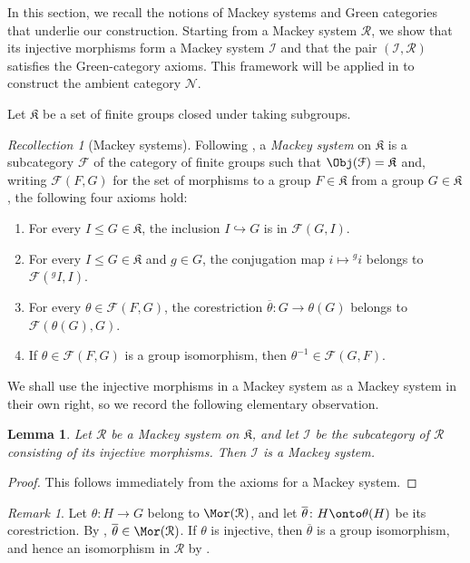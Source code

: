 \documentclass{amsart}
\numberwithin{equation}{section}%
\newtheorem{Lem}[equation]{Lemma}
\theoremstyle{remark}
\newtheorem{Rem}[equation]{Remark}
\newtheorem{Rec}[equation]{Recollection}
\theoremstyle{definition}
\newcommand{\ol}[1]{\overline{#1}}
\begin{document}
In this section, we recall the notions of Mackey systems and Green
categories that underlie our construction. Starting from a Mackey
system $\mathcal R$, we show that its injective morphisms form a
Mackey system $\mathcal I$ and that the pair
$(\mathcal I,\mathcal R)$ satisfies the Green-category axioms.
This framework will be applied in 
to construct the ambient category $\mathcal N$.

Let $\mathfrak K$ be a set of finite groups closed under taking subgroups.
%
\begin{Rec}[Mackey systems]
	\label{rec:mackey-systems}
Following \cite[Sec.~3]{Barker16a}, a \emph{Mackey system} on
$\mathfrak K$ is a subcategory $\mathcal F$ of the category of finite
groups such that 
$\Obj(\mathcal{F}) = \mathfrak{K}$ and, writing
$\mathcal{F}(F,G)$ for the set of morphisms to a group 
$F \in \mathfrak{K}$ from a group $G \in \mathfrak{K}$,
the following four axioms hold:

\begin{enumerate}[\rm({MS}\,1)]
\item 
\label{it:MS-1}%
For every $I \leq G \in \mathfrak{K}$, 
the inclusion $I \hookrightarrow G$ is in $\mathcal{F}(G, I)$.
\item 
\label{it:MS-2}%
For every $I \leq G \in \mathfrak{K}$ and $g\in G$, 
the conjugation map $i\mapsto {}^{g}i$ belongs to $\mathcal{F}(^{g}I, I)$.
\item 
\label{it:MS-3}%
For every $\theta\in\mathcal F(F,G)$, the
corestriction $\ol{\theta}\colon G \to \theta(G)$
belongs to $\mathcal F(\theta(G),G)$.
\item 
\label{it:MS-4}%
If $\theta\in\mathcal F(F,G)$ is a group
isomorphism, then $\theta^{-1}\in\mathcal F(G,F)$.
\end{enumerate}
\end{Rec}
%
We shall use the injective morphisms in a Mackey system as a 
Mackey system in their own right, so we record the following elementary observation.
%
\begin{Lem}
\label{lem:injective-morphisms-mackey-system}
Let $\mathcal R$ be a Mackey system on $\mathfrak K$, and let
$\mathcal I$ be the subcategory of $\mathcal R$ consisting of its
injective morphisms. Then $\mathcal I$ is a Mackey system.
\end{Lem}
%
\begin{proof} 
This follows immediately from the axioms for a Mackey system. 
\end{proof}
%
\begin{Rem}
\label{rem:corestrictions}
Let $\theta\colon H\to G$ belong to $\Mor(\mathcal R)$, and let
$\ol{\theta}\colon H\onto\theta(H)$ be its corestriction.
By , $\ol{\theta}\in\Mor(\mathcal R)$.
If $\theta$ is injective, then $\ol{\theta}$ is a group isomorphism,
and hence an isomorphism in $\mathcal R$ by .
\end{Rem}
\end{document}
